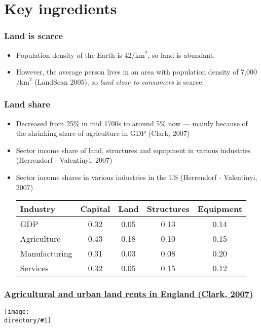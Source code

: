 \documentclass[compress,mathserif]{beamer}
\newcommand{\directory}{figures}
\newcommand{\widefigure}[2]{\begin{frame}\frametitle{\hyperlink{#1back}{#2}}\hypertarget{#1}{{\begin{center}\texttt{[image: \\directory/\#1]}\end{center}}}\end{frame}}
\begin{document}
\section{Key ingredients}
\begin{frame}\frametitle{Land is scarce}
\begin{itemize}
    \item Population density of the Earth is 42$/\text{km}^2$, so land is abundant.
    \item However, the average person lives in an area with population density of 7,000$/\text{km}^2$ (LandScan 2005),
    so \emph{land close to consumers} is scarce.
\end{itemize}
\end{frame}

\begin{frame}\frametitle{Land share}
\begin{itemize}
\item Decreased from 25\% in mid 1700s to around 5\% now --- mainly
because of the shrinking share of agriculture in GDP (Clark, 2007)
\item Sector income share of land, structures and equipment in various industries (Herrendorf - Valentinyi, 2007)
\item Sector income shares in various industries in the US (Herrendorf - Valentinyi, 2007)
\begin{center}
\begin{tabular}{l|c|ccc}
\hline\hline
Industry    & Capital   &   Land    & Structures    & Equipment \\ \hline
GDP         &   0.32    &   0.05    & 0.13          & 0.14      \\ \hline
Agriculture & 0.43      &   0.18    & 0.10          & 0.15      \\
Manufacturing & 0.31    &   0.03    & 0.08          & 0.20      \\
Services    & 0.32      & 0.05      & 0.15          & 0.12      \\ \hline\hline
\end{tabular}
\end{center}
\end{itemize}
\end{frame}

\widefigure{clark-landrents}{Agricultural and urban land rents in England (Clark, 2007)}
\end{document}
